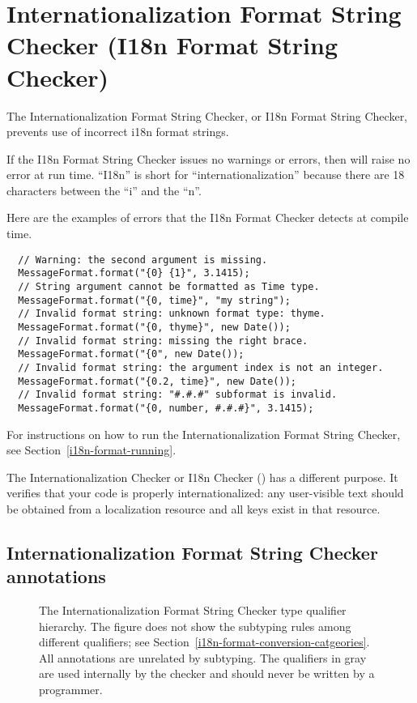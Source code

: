 \htmlhr
\chapter{Internationalization Format String Checker (I18n Format String Checker)\label{i18n-formatter-checker}}

The Internationalization Format String Checker, or I18n Format String Checker,
prevents use of incorrect i18n format strings.

If the I18n Format String Checker issues no warnings or errors, then
will raise no error at run time.
``I18n'' is short for
``internationalization'' because there are 18 characters between the ``i'' and
the ``n''.

Here are the examples of errors that the
I18n Format Checker
detects at compile time.

\begin{Verbatim}
  // Warning: the second argument is missing.
  MessageFormat.format("{0} {1}", 3.1415);
  // String argument cannot be formatted as Time type.
  MessageFormat.format("{0, time}", "my string");
  // Invalid format string: unknown format type: thyme.
  MessageFormat.format("{0, thyme}", new Date());
  // Invalid format string: missing the right brace.
  MessageFormat.format("{0", new Date());
  // Invalid format string: the argument index is not an integer.
  MessageFormat.format("{0.2, time}", new Date());
  // Invalid format string: "#.#.#" subformat is invalid.
  MessageFormat.format("{0, number, #.#.#}", 3.1415);
\end{Verbatim}

For instructions on how to run the Internationalization Format String
Checker, see Section~\ref{i18n-format-running}.

The Internationalization Checker or I18n Checker ()
has a different purpose.  It verifies that your code is properly
internationalized: any user-visible text should be obtained from a
localization resource and all keys exist in that resource.


\section{Internationalization Format String Checker annotations\label{i18n-format-annotation}}


\begin{figure}
\caption{The
  Internationalization
  Format String Checker type qualifier hierarchy.
  The figure does not show the subtyping rules among different
  qualifiers; see
  Section~\ref{i18n-format-conversion-catgeories}.
  All  annotations are unrelated by subtyping.
  The qualifiers in gray are used internally by
  the checker and should never be written by a programmer.
}
\label{i18n-format-type-hierarchy}
\end{figure}

